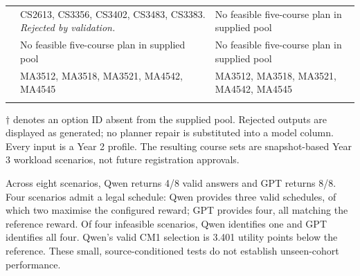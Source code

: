 \documentclass{article}
\begin{document}
{\begin{longtable}{p{2.45in}p{1.35in}p{1.35in}}
\addlinespace[4pt]
{\raggedright \textbf{CS3; CS.} Passed: CS base; plus GE2340. \textit{Preference:} Data Science.\par} & {\raggedright CS2613, CS3356, CS3402, CS3483, CS3383. \textit{Rejected by validation.}\par} & {\raggedright No feasible five-course plan in supplied pool\par}\\
\addlinespace[4pt]
{\raggedright \textbf{CM4; CM.} Passed: CM base except MA2510; plus GE2260. \textit{Preference:} Financial Mathematics.\par} & {\raggedright No feasible five-course plan in supplied pool\par} & {\raggedright No feasible five-course plan in supplied pool\par}\\
\addlinespace[4pt]
{\raggedright \textbf{CM5; CM.} Passed: CM base except MA2503; plus GE2260. \textit{Preference:} Financial Mathematics.\par} & {\raggedright MA3512, MA3518, MA3521, MA4542, MA4545\par} & {\raggedright MA3512, MA3518, MA3521, MA4542, MA4545\par}\\
\addlinespace[4pt]
\end{longtable}
}

\noindent\footnotesize $\dagger$ denotes an option ID absent from the supplied pool. Rejected outputs are displayed as generated; no planner repair is substituted into a model column. Every input is a Year 2 profile. The resulting course sets are snapshot-based Year 3 workload scenarios, not future registration approvals.\normalsize

Across eight scenarios, Qwen returns 4/8 valid answers and GPT returns 8/8. Four scenarios admit a legal schedule: Qwen provides three valid schedules, of which two maximise the configured reward; GPT provides four, all matching the reference reward. Of four infeasible scenarios, Qwen identifies one and GPT identifies all four. Qwen's valid CM1 selection is 3.401 utility points below the reference. These small, source-conditioned tests do not establish unseen-cohort performance.
\end{document}
